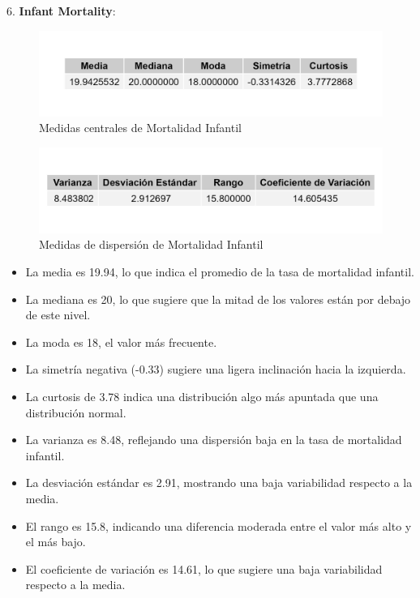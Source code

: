 \documentclass{article}
\begin{document}
6. \textbf{Infant Mortality}:
\begin{figure}[h!]
 \centering
 \includegraphics[width=\textwidth]{Swiss/Infant.Mortality_central.png}
 \caption{Medidas centrales de Mortalidad Infantil}
\end{figure}

\begin{figure}[h!]
    \centering
    \includegraphics[width=\textwidth]{Swiss/Infant.Mortality_dispersion.png}
    \caption{Medidas de dispersión de Mortalidad Infantil}
\end{figure}
\begin{itemize}
    \item La media es 19.94, lo que indica el promedio de la tasa de mortalidad infantil.
    \item La mediana es 20, lo que sugiere que la mitad de los valores están por debajo de este nivel.
    \item La moda es 18, el valor más frecuente.
    \item La simetría negativa (-0.33) sugiere una ligera inclinación hacia la izquierda.
    \item La curtosis de 3.78 indica una distribución algo más apuntada que una distribución normal.
    \item La varianza es 8.48, reflejando una dispersión baja en la tasa de mortalidad infantil.
    \item La desviación estándar es 2.91, mostrando una baja variabilidad respecto a la media.
    \item El rango es 15.8, indicando una diferencia moderada entre el valor más alto y el más bajo.
    \item El coeficiente de variación es 14.61, lo que sugiere una baja variabilidad respecto a la media.
\end{itemize}
\end{document}
